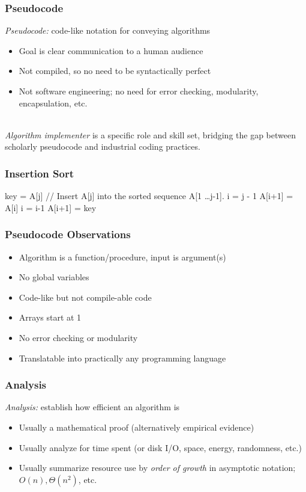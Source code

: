 \documentclass{beamer}
\newcommand{\stanza}{ \\~\ }
\begin{document}
\begin{frame} \frametitle{Pseudocode}
  \emph{Pseudocode:} code-like notation for conveying algorithms
  \begin{itemize}
    \item Goal is clear communication to a human audience
    \item Not compiled, so no need to be syntactically perfect
    \item Not software engineering; no need for error checking, modularity,
      encapsulation, etc. \stanza
  \end{itemize}

  \emph{Algorithm implementer} is a specific role and skill set, bridging the
    gap between scholarly pseudocode and industrial coding practices.
\end{frame}

\begin{frame} \frametitle{Insertion Sort}

\begin{algorithmic}[1]
    \State key = A[j]
    \State // Insert A[j] into the sorted sequence A[1 \ldots j-1].
    \State i = j - 1
      \State A[i+1] = A[i]
      \State i = i-1
    \EndWhile
    \State A[i+1] = key
  \EndFor
  \EndFunction
\end{algorithmic}

\end{frame}

\begin{frame} \frametitle{Pseudocode Observations}
  \begin{itemize}
    \item Algorithm is a function/procedure, input is argument(s)
    \item No global variables
    \item Code-like but not compile-able code
    \item Arrays start at 1
    \item No error checking or modularity
    \item Translatable into practically any programming language
  \end{itemize}
\end{frame}

\begin{frame} \frametitle{Analysis}
  \emph{Analysis:} establish how efficient an algorithm is
  \begin{itemize}
    \item Usually a mathematical proof (alternatively empirical evidence)
    \item Usually analyze for time spent (or disk I/O, space, energy,
      randomness, etc.)
    \item Usually summarize resource use by \emph{order of growth} in
      asymptotic notation; $O(n), \Theta(n^2)$, etc.
  \end{itemize}
\end{frame}
\end{document}
